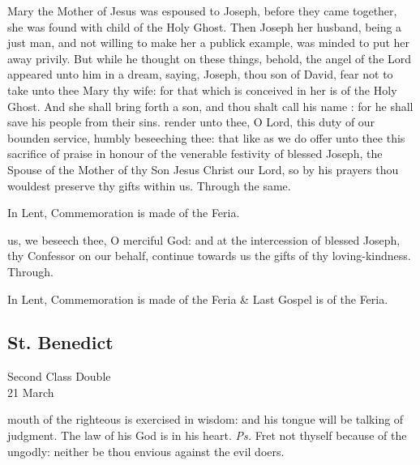  Mary the Mother of Jesus was espoused to Joseph, before they came together, she was found with child of the Holy Ghost. Then Joseph her husband, being a just man, and not willing to make her a publick example, was minded to put her away privily. But while he thought on these things, behold, the angel of the Lord appeared unto him in a dream, saying, Joseph, thou son of David, fear not to take unto thee Mary thy wife: for that which is conceived in her is of the Holy Ghost. And she shall bring forth a son, and thou shalt call his name : for he shall save his people from their sins.
\secret
{} render unto thee, O Lord, this duty of our bounden service, humbly beseeching thee: that like as we do offer unto thee this sacrifice of praise in honour of the venerable festivity of blessed Joseph, the Spouse of the Mother of thy Son Jesus Christ our Lord, so by his prayers thou wouldest preserve thy gifts within us. Through the same.
\begin{rubric}
    In Lent, Commemoration is made of the Feria.
\end{rubric}
\postcommunion
{} us, we beseech thee, O merciful God: and at the intercession of blessed Joseph, thy Confessor on our behalf, continue towards us the gifts of thy loving-kindness. Through.
\begin{rubric}
    In Lent, Commemoration is made of the Feria \& Last Gospel is of the Feria.
\end{rubric}


\clearpage
\subsection{St. Benedict}
\begin{inhead}
    {Second Class Double\\
21 March}
\end{inhead}

\introit
 mouth of the righteous is exercised in wisdom: and his tongue will be talking of judgment. The law of his God is in his heart. \textit{Ps.} Fret not thyself because of the ungodly: neither be thou envious against the evil doers.

